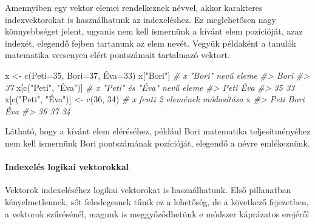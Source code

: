 \documentclass[
]{book}
\newenvironment{Shaded}{\begin{snugshade}}{\end{snugshade}}
\newcommand{\CommentTok}[1]{\textcolor[rgb]{0.56,0.35,0.01}{\textit{#1}}}
\newcommand{\DecValTok}[1]{\textcolor[rgb]{0.00,0.00,0.81}{#1}}
\newcommand{\FunctionTok}[1]{\textcolor[rgb]{0.00,0.00,0.00}{#1}}
\newcommand{\NormalTok}[1]{#1}
\newcommand{\OtherTok}[1]{\textcolor[rgb]{0.56,0.35,0.01}{#1}}
\newcommand{\StringTok}[1]{\textcolor[rgb]{0.31,0.60,0.02}{#1}}
\begin{document}
Amennyiben egy vektor elemei rendelkeznek névvel, akkor karakteres indexvektorokat is használhatunk az indexeléshez. Ez meglehetősen nagy könnyebbséget jelent, ugyanis nem kell ismernünk a kívánt elem pozícióját, azaz indexét, elegendő fejben tartanunk az elem nevét. Vegyük példaként a tanulók matematika versenyen elért pontszámait tartalmazó vektort.

\begin{Shaded}
\begin{Highlighting}[]
\NormalTok{x }\OtherTok{\textless{}{-}} \FunctionTok{c}\NormalTok{(}\StringTok{\textquotesingle{}Peti\textquotesingle{}}\OtherTok{=}\DecValTok{35}\NormalTok{, }\StringTok{\textquotesingle{}Bori\textquotesingle{}}\OtherTok{=}\DecValTok{37}\NormalTok{, }\StringTok{\textquotesingle{}Éva\textquotesingle{}}\OtherTok{=}\DecValTok{33}\NormalTok{)}
\NormalTok{x[}\StringTok{"Bori"}\NormalTok{]                              }\CommentTok{\# x "Bori" nevű eleme}
\CommentTok{\#\textgreater{} Bori }
\CommentTok{\#\textgreater{}   37}
\NormalTok{x[}\FunctionTok{c}\NormalTok{(}\StringTok{"Peti"}\NormalTok{, }\StringTok{"Éva"}\NormalTok{)]                    }\CommentTok{\# x "Peti" és "Éva" nevű eleme}
\CommentTok{\#\textgreater{} Peti  Éva }
\CommentTok{\#\textgreater{}   35   33}
\NormalTok{x[}\FunctionTok{c}\NormalTok{(}\StringTok{"Peti"}\NormalTok{, }\StringTok{"Éva"}\NormalTok{)] }\OtherTok{\textless{}{-}} \FunctionTok{c}\NormalTok{(}\DecValTok{36}\NormalTok{, }\DecValTok{34}\NormalTok{)       }\CommentTok{\# x fenti 2 elemének módosítása}
\NormalTok{x}
\CommentTok{\#\textgreater{} Peti Bori  Éva }
\CommentTok{\#\textgreater{}   36   37   34}
\end{Highlighting}
\end{Shaded}

Látható, hogy a kívánt elem eléréséhez, például Bori matematika teljesítményéhez nem kell ismernünk Bori pontszámának pozícióját, elegendő a névre emlékeznünk.

\hypertarget{indexeluxe9s-logikai-vektorokkal}{%
\paragraph{Indexelés logikai vektorokkal}\label{indexeluxe9s-logikai-vektorokkal}}

Vektorok indexeléséhez logikai vektorokat is használhatunk. Első pillanatban kényelmetlennek, sőt feleslegesnek tűnik ez a lehetőség, de a következő fejezetben, a vektorok szűrésénél, magunk is meggyőződhetünk e módszer káprázatos erejéről
\end{document}
